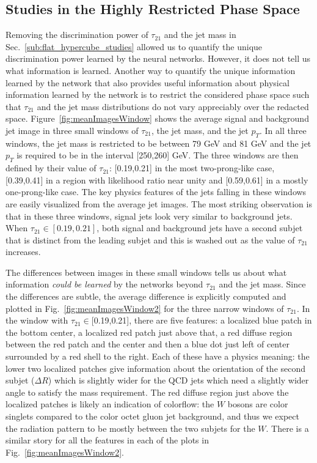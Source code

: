 \subsection{Studies in the Highly Restricted Phase Space} %
\label{sub:small_window_studies}

Removing the discrimination power of $\tau_{21}$ and the jet mass in Sec.~\ref{sub:flat_hypercube_studies} allowed us to quantify the unique discrimination power learned by the neural networks.  However, it does not tell us what information is learned.  Another way to quantify the unique information learned by the network that also provides useful information about physical information learned by the network is to restrict the considered phase space such that $\tau_{21}$ and the jet mass distributions do not vary appreciably over the redacted space.  Figure~\ref{fig:meanImagesWindow} shows the average signal and background jet image in three small windows of $\tau_{21}$, the jet mass, and the jet $p_T$.  In all three windows, the jet mass is restricted to be between 79 GeV and 81 GeV and the jet $p_T$ is required to be in the interval [250,260] GeV.  The three windows are then defined by their value of $\tau_{21}$: [0.19,0.21] in the most two-prong-like case, [0.39,0.41] in a region with likelihood ratio near unity and [0.59,0.61] in a mostly one-prong-like case.  The key physics features of the jets falling in these windows are easily visualized from the average jet images.  The most striking observation is that in these three windows, signal jets look very similar to background jets.  When $\tau_{21}\in[0.19,0.21]$, both signal and background jets have a second subjet that is distinct from the leading subjet and this is washed out as the value of $\tau_{21}$ increases.  

The differences between images in these small windows tells us about what information {\it could be learned} by the networks beyond $\tau_{21}$ and the jet mass.  Since the differences are subtle, the average difference is explicitly computed and plotted in Fig.~\ref{fig:meanImagesWindow2} for the three narrow windows of $\tau_{21}$.  In the window with $\tau_{21}\in$[0.19,0.21], there are five features: a localized blue patch in the bottom center, a localized red patch just above that, a red diffuse region between the red patch and the center and then a blue dot just left of center surrounded by a red shell to the right.  Each of these have a physics meaning: the lower two localized patches give information about the orientation of the second subjet ($\Delta R$) which is slightly wider for the QCD jets which need a slightly wider angle to satisfy the mass requirement.  The red diffuse region just above the localized patches is likely an indication of colorflow: the $W$ bosons are color singlets compared to the color octet gluon jet background, and thus we expect the radiation pattern to be mostly between the two subjets for the $W$.  There is a similar story for all the features in each of the plots in Fig.~\ref{fig:meanImagesWindow2}.

